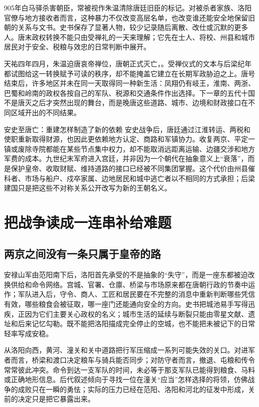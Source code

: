905年白马驿杀害朝臣，常被视作朱温清除唐廷旧臣的标记。对被杀者家族、洛阳官僚与地方接收者而言，这种暴力不仅改变高层名单，也改变谁还能安全地保留旧朝的关系与文书。史书保存了显著人物，较少记录随后离散、改仕或沉默的更多人。唐末政权转换不能只由受禅礼的一天来理解；它先在士人、将校、州县和城市居民对于安全、税粮与效忠的日常判断中展开。

天祐四年四月，朱温迫唐哀帝禅位，唐朝正式灭亡，。受禅仪式的文本与后梁纪年都试图给这一转换赋予可读的秩序，却不能掩盖它建立在长期军政胁迫之上。唐号结束后，许多地区并未在同一天取得同一种新生活：凤翔仍有岐王，淮南、两浙、巴蜀和岭南的政权各按自己的军队、税源和交通条件作出选择。下一章的五代十国不是唐灭之后才突然出现的舞台，而是晚唐这些道路、城市、边境和财政接口在不同区域开出的不同结果。

\begin{turningpoint}{安史至唐亡：重建怎样制造了新的依赖}
安史战争后，唐廷通过江淮转运、两税和使职重新取得财源，也因此更依赖地方认定、商路和军镇协力。收复两京、平定一镇或废除寺院都能在某些节点集中权力，却不能取消远距离运输、边疆交涉和地方军费的成本。九世纪末军府进入宫廷，并非因为一个朝代在抽象意义上“衰落”，而是保护皇帝、收取财赋、维持道路的接口已经被不同集团掌握。这个代价由州县催科者、市场与船户、戍卒家属、边地居民和城中逃亡者以不相同的方式承担；后梁建国只是把这些不对称关系公开改写为新的王朝名义。
\end{turningpoint}

\section{把战争读成一连串补给难题}

\subsection{两京之间没有一条只属于皇帝的路}
安禄山军由范阳南下后，洛阳首先承受的不是抽象的“失守”，而是一座东都被迫改换供给和命令网络。宫城、官署、仓廪、桥梁与市场原来都在唐朝行政的节奏中运作；军队进入后，守令、商人、工匠和居民要在不完整的消息中重新判断哪些凭信有效，哪些粮食会被征取，哪一座门还能通向安全的方向。史书把城池易手写得迅疾，正因为它们主要关心政权的名义；城市生活的延续与断裂只能由零星文献、遗址和后来记忆勾勒。既不能把洛阳描成完全停止的空城，也不能把未被记下的日常轻率写成安稳。

从洛阳向西，黄河、潼关和关中道路把行军压缩成一系列可能失效的关口。对进军者而言，桥梁和渡口决定粮车与骑兵能否同步；对防守者而言，撤退、屯粮和传令常常彼此冲突。命令到达一支军队的时间，未必等于那支军队已能得到粮食、马料或正确地形信息。后代叙述倾向于寻找一位在潼关“应当”怎样选择的将领，仿佛战争的成败只在一瞬的勇怯；实际的压力已经在范阳、洛阳和河北的征发中形成，关前的决定只是把它暴露出来。

